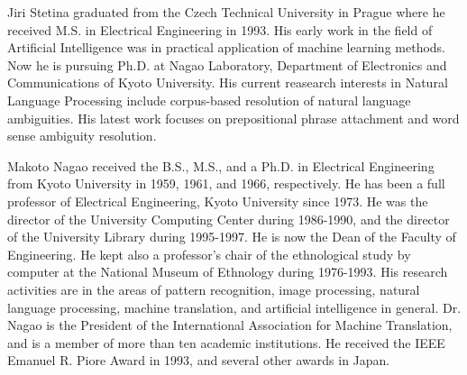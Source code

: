 \begin{biography}

\biotitle{}

{
Jiri Stetina graduated from the Czech Technical University in Prague
where he received M.S. in Electrical Engineering in 1993. His \mbox{early}
work in the field of Artificial Intelligence was in practical
application of machine learning methods. Now he is pursuing Ph.D. at
Nagao Laboratory, Department of Electronics and Communications of
Kyoto University. His current reasearch interests in Natural Language
Processing include corpus-based resolution of natural language
ambiguities. His latest work focuses on prepositional phrase
attachment and word sense ambiguity resolution.
}

{
Makoto Nagao received the B.S., M.S., and a Ph.D. in Electrical
Engineering from Kyoto University in 1959, 1961, and 1966,
respectively. He has been a full professor of Electrical Engineering,
Kyoto University since 1973. He was the director of the University
Computing Center during 1986-1990, and the director of the University
Library during 1995-1997. He is now the Dean of the Faculty of
Engineering. He kept also a professor's chair of the ethnological
study by computer at the National Museum of Ethnology during
1976-1993. His research activities are in the areas of pattern
recognition, image processing, natural language processing, machine
translation, and artificial intelligence in general. Dr. Nagao is the
President of the International Association for Machine Translation,
and is a member of more than ten academic institutions. He received
the IEEE Emanuel R. Piore Award in 1993, and several other awards in
Japan.
}


\end{biography}




